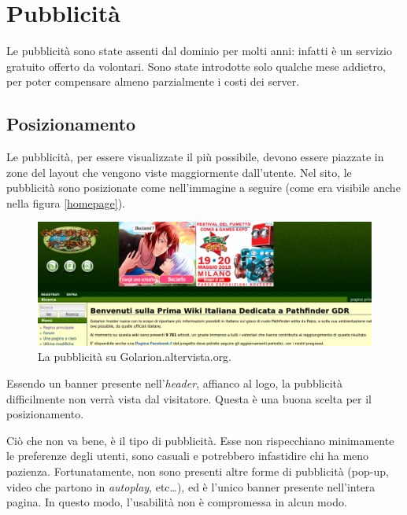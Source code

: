 \section{Pubblicità}

Le pubblicità sono state assenti dal dominio per molti anni: infatti è un servizio gratuito
offerto da volontari. Sono state introdotte solo qualche mese addietro, per poter compensare
almeno parzialmente i costi dei server.

\subsection{Posizionamento}
Le pubblicità, per essere visualizzate il più possibile, devono essere piazzate in zone del
layout che vengono viste maggiormente dall'utente. Nel sito, le pubblicità sono posizionate
come nell'immagine a seguire (come era visibile anche nella figura \ref{homepage}).

\begin{figure}[hbt]
    \includegraphics[width=\textwidth]{img/pubblicita.png}
    \caption{La pubblicità su Golarion.altervista.org.}
\end{figure}

Essendo un banner presente nell'\emph{header}, affianco al logo, la pubblicità difficilmente non verrà vista 
dal visitatore. Questa è una buona scelta per il posizionamento.\par
Ciò che non va bene, è il tipo di pubblicità. Esse non rispecchiano minimamente le preferenze degli utenti, 
sono casuali e potrebbero infastidire chi ha meno pazienza.
Fortunatamente, non sono presenti altre forme di pubblicità (pop-up, video che partono in \emph{autoplay}, etc\dots),
ed è l'unico banner presente nell'intera pagina. In questo modo, l'usabilità non è compromessa in alcun modo.